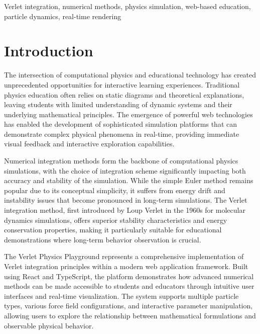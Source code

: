 \documentclass[12pt,journal,onecolumn]{IEEEtran}
\begin{document}
\begin{IEEEkeywords}
Verlet integration, numerical methods, physics simulation, web-based education, particle dynamics, real-time rendering
\end{IEEEkeywords}

\clearpage
\tableofcontents
\clearpage
\listoffigures
\clearpage
\listoftables
\clearpage

\section{Introduction}
The intersection of computational physics and educational technology has created unprecedented opportunities for interactive learning experiences. Traditional physics education often relies on static diagrams and theoretical explanations, leaving students with limited understanding of dynamic systems and their underlying mathematical principles. The emergence of powerful web technologies has enabled the development of sophisticated simulation platforms that can demonstrate complex physical phenomena in real-time, providing immediate visual feedback and interactive exploration capabilities.

Numerical integration methods form the backbone of computational physics simulations, with the choice of integration scheme significantly impacting both accuracy and stability of the simulation. While the simple Euler method remains popular due to its conceptual simplicity, it suffers from energy drift and instability issues that become pronounced in long-term simulations. The Verlet integration method, first introduced by Loup Verlet in the 1960s for molecular dynamics simulations, offers superior stability characteristics and energy conservation properties, making it particularly suitable for educational demonstrations where long-term behavior observation is crucial.

The Verlet Physics Playground represents a comprehensive implementation of Verlet integration principles within a modern web application framework. Built using React and TypeScript, the platform demonstrates how advanced numerical methods can be made accessible to students and educators through intuitive user interfaces and real-time visualization. The system supports multiple particle types, various force field configurations, and interactive parameter manipulation, allowing users to explore the relationship between mathematical formulations and observable physical behavior.
\end{document}
